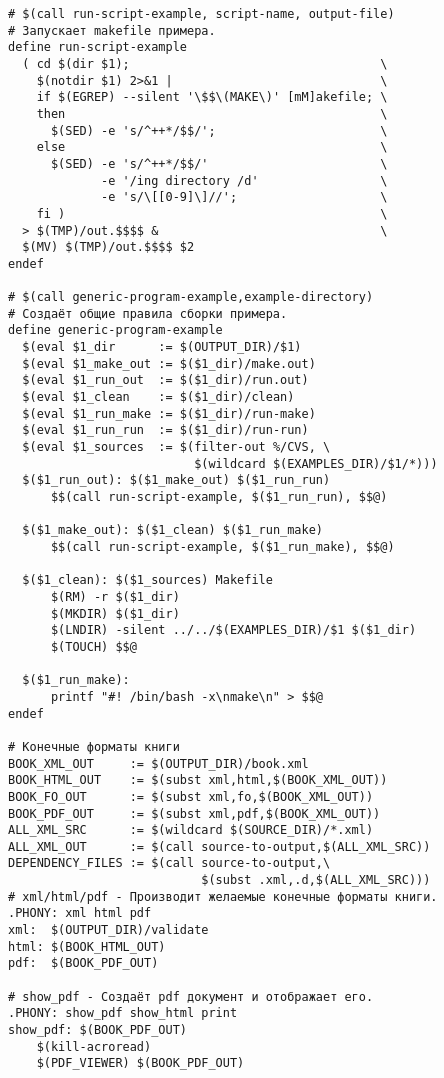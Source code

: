 \begin{verbatim}
# $(call run-script-example, script-name, output-file)
# Запускает makefile примера.
define run-script-example
  ( cd $(dir $1);                                   \
    $(notdir $1) 2>&1 |                             \
    if $(EGREP) --silent '\$$\(MAKE\)' [mM]akefile; \
    then                                            \
      $(SED) -e 's/^++*/$$/';                       \
    else                                            \
      $(SED) -e 's/^++*/$$/'                        \
             -e '/ing directory /d'                 \
             -e 's/\[[0-9]\]//';                    \
    fi )                                            \
  > $(TMP)/out.$$$$ &                               \
  $(MV) $(TMP)/out.$$$$ $2
endef

# $(call generic-program-example,example-directory)
# Создаёт общие правила сборки примера.
define generic-program-example
  $(eval $1_dir      := $(OUTPUT_DIR)/$1)
  $(eval $1_make_out := $($1_dir)/make.out)
  $(eval $1_run_out  := $($1_dir)/run.out)
  $(eval $1_clean    := $($1_dir)/clean)
  $(eval $1_run_make := $($1_dir)/run-make)
  $(eval $1_run_run  := $($1_dir)/run-run)
  $(eval $1_sources  := $(filter-out %/CVS, \
                          $(wildcard $(EXAMPLES_DIR)/$1/*)))
  $($1_run_out): $($1_make_out) $($1_run_run)
      $$(call run-script-example, $($1_run_run), $$@)

  $($1_make_out): $($1_clean) $($1_run_make)
      $$(call run-script-example, $($1_run_make), $$@)

  $($1_clean): $($1_sources) Makefile
      $(RM) -r $($1_dir)
      $(MKDIR) $($1_dir)
      $(LNDIR) -silent ../../$(EXAMPLES_DIR)/$1 $($1_dir)
      $(TOUCH) $$@

  $($1_run_make):
      printf "#! /bin/bash -x\nmake\n" > $$@
endef

# Конечные форматы книги
BOOK_XML_OUT     := $(OUTPUT_DIR)/book.xml
BOOK_HTML_OUT    := $(subst xml,html,$(BOOK_XML_OUT))
BOOK_FO_OUT      := $(subst xml,fo,$(BOOK_XML_OUT))
BOOK_PDF_OUT     := $(subst xml,pdf,$(BOOK_XML_OUT))
ALL_XML_SRC      := $(wildcard $(SOURCE_DIR)/*.xml)
ALL_XML_OUT      := $(call source-to-output,$(ALL_XML_SRC))
DEPENDENCY_FILES := $(call source-to-output,\
                           $(subst .xml,.d,$(ALL_XML_SRC)))
# xml/html/pdf - Производит желаемые конечные форматы книги.
.PHONY: xml html pdf
xml:  $(OUTPUT_DIR)/validate
html: $(BOOK_HTML_OUT)
pdf:  $(BOOK_PDF_OUT)

# show_pdf - Создаёт pdf документ и отображает его.
.PHONY: show_pdf show_html print
show_pdf: $(BOOK_PDF_OUT)
    $(kill-acroread)
    $(PDF_VIEWER) $(BOOK_PDF_OUT)


\end{verbatim}
